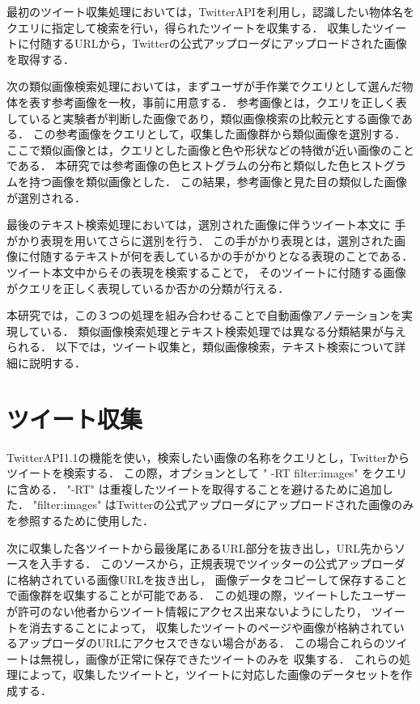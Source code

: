 
最初のツイート収集処理においては，TwitterAPIを利用し，認識したい物体名をクエリに指定して検索を行い，得られたツイートを収集する．
収集したツイートに付随するURLから，Twitterの公式アップローダにアップロードされた画像を取得する．

次の類似画像検索処理においては，まずユーザが手作業でクエリとして選んだ物体を表す参考画像を一枚，事前に用意する．
参考画像とは，クエリを正しく表していると実験者が判断した画像であり，類似画像検索の比較元とする画像である．
この参考画像をクエリとして，収集した画像群から類似画像を選別する．
ここで類似画像とは，クエリとした画像と色や形状などの特徴が近い画像のことである．
本研究では参考画像の色ヒストグラムの分布と類似した色ヒストグラムを持つ画像を類似画像とした．
この結果，参考画像と見た目の類似した画像が選別される．

最後のテキスト検索処理においては，選別された画像に伴うツイート本文に
手がかり表現を用いてさらに選別を行う．
この手がかり表現とは，選別された画像に付随するテキストが何を表しているかの手がかりとなる表現のことである．
ツイート本文中からその表現を検索することで，
そのツイートに付随する画像がクエリを正しく表現しているか否かの分類が行える．

本研究では，この３つの処理を組み合わせることで自動画像アノテーションを実現している．
類似画像検索処理とテキスト検索処理では異なる分類結果が与えられる．
以下では，ツイート収集と，類似画像検索，テキスト検索について詳細に説明する．

\section{ツイート収集}
\label{sec:tweetCollect}
TwitterAPI1.1の機能を使い，検索したい画像の名称をクエリとし，Twitterからツイートを検索する．
この際，オプションとして " -RT filter:images" をクエリに含める．
"-RT" は重複したツイートを取得することを避けるために追加した．
"filter:images" はTwitterの公式アップローダにアップロードされた画像のみを参照するために使用した．

次に収集した各ツイートから最後尾にあるURL部分を抜き出し，URL先からソースを入手する．
このソースから，正規表現でツイッターの公式アップローダに格納されている画像URLを抜き出し，
画像データをコピーして保存することで画像群を収集することが可能である．
この処理の際，ツイートしたユーザーが許可のない他者からツイート情報にアクセス出来ないようにしたり，
ツイートを消去することによって，
収集したツイートのページや画像が格納されているアップローダのURLにアクセスできない場合がある．
この場合これらのツイートは無視し，画像が正常に保存できたツイートのみを
収集する．
これらの処理によって，収集したツイートと，ツイートに対応した画像のデータセットを作成する．


